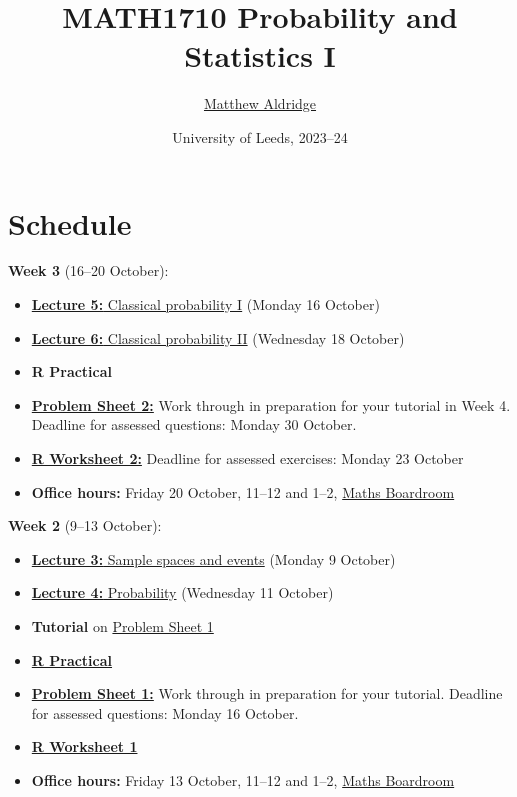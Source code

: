 \documentclass[
  a4paper,
]{book}
\title{MATH1710 Probability and Statistics I}
\author{\href{https://mpaldridge.github.io/}{Matthew Aldridge}}
\date{University of Leeds, 2023--24}
\providecommand{\tightlist}{%
  \setlength{\itemsep}{0pt}\setlength{\parskip}{0pt}}
\theoremstyle{definition}
\theoremstyle{definition}
\theoremstyle{definition}
\theoremstyle{definition}
\theoremstyle{remark}
\begin{document}
\maketitle

{
\setcounter{tocdepth}{1}
\tableofcontents
}
\hypertarget{schedule}{%
\chapter*{Schedule}\label{schedule}}

\newcommand{\Var}{\operatorname{Var}}

\textbf{Week 3} (16--20 October):

\begin{itemize}
\tightlist
\item
  \protect\hyperlink{L05-classical-i}{\textbf{Lecture 5:} Classical probability I} (Monday 16 October)
\item
  \protect\hyperlink{L06-classical-ii}{\textbf{Lecture 6:} Classical probability II} (Wednesday 18 October)
\item
  \textbf{R Practical}
\item
  \protect\hyperlink{P2}{\textbf{Problem Sheet 2:}} Work through in preparation for your tutorial in Week 4. Deadline for assessed questions: Monday 30 October.
\item
  \protect\hyperlink{R}{\textbf{R Worksheet 2:}} Deadline for assessed exercises: Monday 23 October
\item
  \textbf{Office hours:} Friday 20 October, 11--12 and 1--2, \href{boardroom.png}{Maths Boardroom}
\end{itemize}

\textbf{Week 2} (9--13 October):

\begin{itemize}
\tightlist
\item
  \protect\hyperlink{L03-events}{\textbf{Lecture 3:} Sample spaces and events} (Monday 9 October)
\item
  \protect\hyperlink{L04-probability}{\textbf{Lecture 4:} Probability} (Wednesday 11 October)
\item
  \textbf{Tutorial} on \protect\hyperlink{P1}{Problem Sheet 1}
\item
  \protect\hyperlink{practical}{\textbf{R Practical}}
\item
  \protect\hyperlink{P1}{\textbf{Problem Sheet 1:}} Work through in preparation for your tutorial. Deadline for assessed questions: Monday 16 October.
\item
  \protect\hyperlink{R}{\textbf{R Worksheet 1}}
\item
  \textbf{Office hours:} Friday 13 October, 11--12 and 1--2, \href{boardroom.png}{Maths Boardroom}
\end{itemize}
\end{document}
